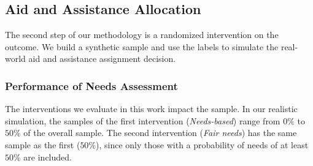 \documentclass{article} %
\begin{document}
\subsection{Aid and Assistance Allocation}
\label{sec:results_distribution}
The second step of our methodology is a randomized intervention on the outcome. We build a synthetic sample and use the labels to simulate the real-world aid and assistance assignment decision. 

\subsubsection{Performance of Needs Assessment}
\label{sec:results_models}
The interventions we evaluate in this work impact the sample. In our realistic simulation, the samples of the first intervention (\emph{Needs-based}) range from $0\%$ to $50\%$ of the overall sample. The second intervention (\emph{Fair needs}) has the same sample as the first ($50\%$), since only those with a probability of needs of at least $50\%$ are included.
\end{document}
